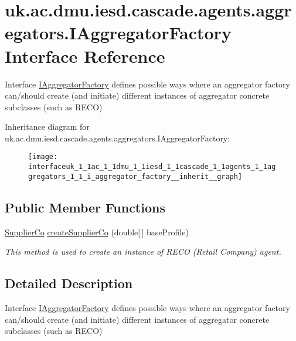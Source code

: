 \hypertarget{interfaceuk_1_1ac_1_1dmu_1_1iesd_1_1cascade_1_1agents_1_1aggregators_1_1_i_aggregator_factory}{\section{uk.\-ac.\-dmu.\-iesd.\-cascade.\-agents.\-aggregators.\-I\-Aggregator\-Factory Interface Reference}
\label{interfaceuk_1_1ac_1_1dmu_1_1iesd_1_1cascade_1_1agents_1_1aggregators_1_1_i_aggregator_factory}
}


Interface \hyperlink{interfaceuk_1_1ac_1_1dmu_1_1iesd_1_1cascade_1_1agents_1_1aggregators_1_1_i_aggregator_factory}{I\-Aggregator\-Factory} defines possible ways where an aggregator factory can/should create (and initiate) different instances of aggregator concrete subclasses (such as {\ttfamily R\-E\-C\-O})  




Inheritance diagram for uk.\-ac.\-dmu.\-iesd.\-cascade.\-agents.\-aggregators.\-I\-Aggregator\-Factory\-:\nopagebreak
\begin{figure}[H]
\begin{center}
\leavevmode
\texttt{[image: interfaceuk\_1\_1ac\_1\_1dmu\_1\_1iesd\_1\_1cascade\_1\_1agents\_1\_1aggregators\_1\_1\_i\_aggregator\_factory\_\_inherit\_\_graph]}
\end{center}
\end{figure}
\subsection*{Public Member Functions}
\begin{DoxyCompactItemize}
\item 
\hyperlink{classuk_1_1ac_1_1dmu_1_1iesd_1_1cascade_1_1agents_1_1aggregators_1_1_supplier_co}{Supplier\-Co} \hyperlink{interfaceuk_1_1ac_1_1dmu_1_1iesd_1_1cascade_1_1agents_1_1aggregators_1_1_i_aggregator_factory_a2bd1b763fcd470a8ba1e0a18b93c8161}{create\-Supplier\-Co} (double\mbox{[}$\,$\mbox{]} base\-Profile)
\begin{DoxyCompactList}\small\item\em This method is used to create an instance of {\ttfamily R\-E\-C\-O} (Retail Company) agent. \end{DoxyCompactList}\end{DoxyCompactItemize}


\subsection{Detailed Description}
Interface \hyperlink{interfaceuk_1_1ac_1_1dmu_1_1iesd_1_1cascade_1_1agents_1_1aggregators_1_1_i_aggregator_factory}{I\-Aggregator\-Factory} defines possible ways where an aggregator factory can/should create (and initiate) different instances of aggregator concrete subclasses (such as {\ttfamily R\-E\-C\-O}) 

